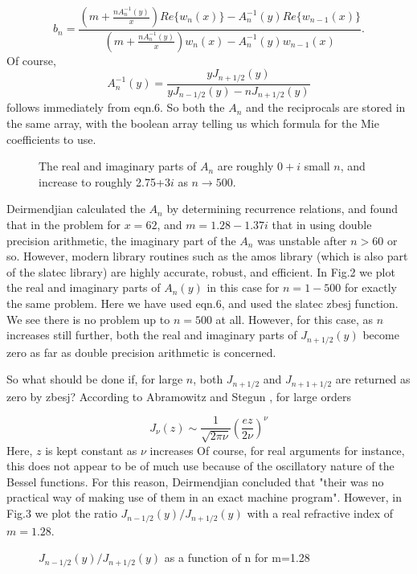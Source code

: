 \begin{equation}
b_n=\frac{ \left ( 
m +\frac{n A^{-1}_n(y)}{x}
 \right )
Re \lbrace w_n(x) \rbrace -A^{-1}_n(y) Re \lbrace w_{n-1}(x) \rbrace
}
{ \left ( 
m +\frac{n A^{-1}_n(y)}{x} 
\right )
 w_n(x) - A^{-1}_n(y) w_{n-1}(x) }.
\end{equation}
Of course,
\begin{equation}
A_n^{-1}(y)=\frac{ y J_{n+1/2}(y)}
                 { y J_{n-1/2}(y)-n J_{n+1/2}(y) }
\end{equation}
follows immediately from eqn.6. So both the $A_n$ and the reciprocals are stored in the same array, with the boolean array telling us which formula for
the Mie coefficients to use.
\vspace*{11cm}
\begin{figure}[htb]
\caption{ The real and imaginary parts of $A_n$ are roughly $0+i$
 small $n$, and increase to roughly 2.75+3$i$ as $n \rightarrow 500$.}
\end{figure}

Deirmendjian calculated the $A_n$ by determining recurrence relations, and found that in the problem for $x=62$, and $m=1.28-1.37i$ that in using double
precision arithmetic, the imaginary part of
the $A_n$ was unstable after $n>60$ or so. However, modern library routines such as the amos library (which is also part of the slatec library) are highly accurate, robust, and efficient. In Fig.2 we plot the real and imaginary parts
of $A_n(y)$ in this case for $n=1 - 500$ for exactly the same problem.  
Here we have used eqn.6, and used the slatec zbesj function. We see there is no problem up to $n=500$ at all.
However, for this case, as $n$ increases still further, both the real and
imaginary parts of $J_{n+1/2}(y)$ become zero as far as double precision
arithmetic is concerned. 

So what should be done if,  for large $n$, both $J_{n+1/2}$ 
and $J_{n+1+1/2}$ 
are returned as zero by zbesj? According to Abramowitz and Stegun
  \cite{AbramowitzStegun:Mybib},  for large orders

\begin{equation}
J_\nu(z) \sim \frac{1}{\sqrt{2 \pi \nu}} 
\left ( \frac{ez}{ 2 \nu} \right )^\nu
\end{equation}
Here, $z$ is kept constant as $\nu$ increases
Of course, for real arguments for instance, this does not appear to be
of much use because of the oscillatory nature of the Bessel functions.
For this reason, Deirmendjian concluded that "their was no practical way 
of making use of them in an exact machine program".
However, in Fig.3 we plot the ratio $J_{n-1/2}(y)/J_{n+1/2}(y)$ 
with a real refractive index of $m=1.28$.
\vspace*{11cm}
\begin{figure}[htb]
\caption{ $J_{n-1/2}(y)/J_{n+1/2}(y)$ as a function of n for m=1.28 }
\end{figure}

